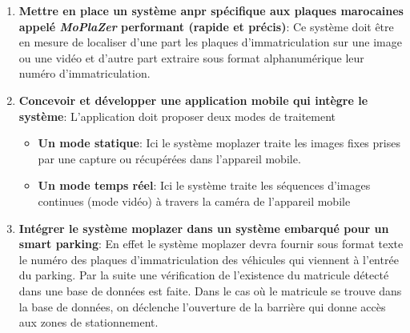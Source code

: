         \begin{enumerate}
            \item \textbf{Mettre en place un système \acrshort{anpr} spécifique aux plaques marocaines appelé \textit{MoPlaZer} performant (rapide et précis)}: Ce système doit être en mesure de localiser d’une part  les plaques d’immatriculation sur une image ou une vidéo et d’autre part extraire sous format alphanumérique leur numéro d’immatriculation.
            \item \textbf{Concevoir et développer une application mobile qui intègre le système}: L’application doit proposer deux modes de traitement
                \begin{itemize}
                    \item \textbf{Un mode statique}: Ici le système \acrshort{moplazer} traite les images fixes prises par une capture ou récupérées dans l’appareil mobile.
                    \item \textbf{Un mode temps réel}: Ici le système traite les séquences d’images continues (mode vidéo) à travers la caméra de l’appareil mobile
                \end{itemize}
            \item \textbf{Intégrer le système \acrshort{moplazer} dans un système embarqué pour un smart parking}: En effet le système \acrshort{moplazer} devra fournir sous format texte le numéro des plaques d’immatriculation des véhicules qui viennent à l’entrée du parking. Par la suite une vérification de l’existence du matricule détecté dans une base de données est faite. Dans le cas où le matricule se trouve dans la base de données, on déclenche l’ouverture de la barrière qui donne accès aux zones de stationnement.
        \end{enumerate}


